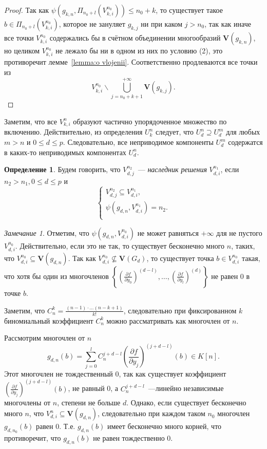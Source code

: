 \documentclass[16pt]{article}
\renewcommand{\le}{\leqslant} %
\theoremstyle{plain1}
\theoremstyle{plain2}
\theoremstyle{plain}
\theoremstyle{plain3}
\theoremstyle{definition}
\newtheorem{definition}[theorem2]{Определение}
\theoremstyle{remark}
\newtheorem{remark}[theorem1]{Замечание}
\begin{document}
\begin{proof}
 Так как $\psi(g_{k,n},\Pi_{n_0+l}({V}_{k,i}^{n_0}))\le n_0+k$, то существует такое $b\in \Pi_{n_0+l}({V}_{k,i}^{n_0})$,  которое не зануляет $g_{k,j}$ ни при каком $j>n_0$, так как иначе все точки ${V}_{k,i}^{n_0}$ содержались бы в счётном объединении многообразий $\mathbf{V}(g_{k,n})$, но целиком ${V}_{k,i}^{n_0}$ не лежало бы ни в одном из них по условию (2), это противоречит лемме~\ref{lemma:o vlojenii}. Соответственно продлеваются все точки из $${V}_{k,i}^{n_0}\backslash \bigcup\limits_{j=n_0+k+1}^{+\infty}\mathbf{V}(g_{k,j}).$$
 \end{proof}


Заметим, что все ${V}_{k,i}^n$ образуют частично упорядоченное множество по включению. Действительно, из определения ${U}_{k}^n$ следует, что ${U}_{d}^n\supseteq {U}_{d}^m$ для любых $m >n$ и $0\le d\le p$. Следовательно,
все неприводимое компоненты ${U}_{d}^m$ содержатся в каких-то неприводимых компонентах ${U}_{d}^n$.



\begin{definition}
Будем говорить, что ${V}_{d,j}^{n_2}$~--- \emph{наследник решения} ${V}_{d,i}^{n_1}$, если $n_2>n_1, 0\le d\le p$ и
$$
\left\{
 \begin{aligned}
 {V}_{d,j}^{n_2}\subseteq {V}_{d,i}^{n_1},\\
 \psi(g_{d,n},{V}_{d,i}^{n_1})=n_2.\\
 \end{aligned}
 \right.
$$
\end{definition}

\begin{remark}\label{remark:o_konechnosti_psi}
Отметим, что $\psi(g_{d,n},{V}_{d,i}^{n_0})$ не может равняться $+\infty$  для не пустого ${V}_{d,i}^{n_0}$. Действительно, если это не так, то существует бесконечно много $n$, таких, что ${V}_{d,i}^{n_0}\subseteq \mathbf{V}(g_{d,n})$. Так как ${V}_{d,i}^{n_0} \not\subseteq \mathbf{V}(G_d)$, то существует точка $b\in {V}_{d,i}^{n_0}$ такая, что хотя бы один из многочленов $\left\{\left(\frac{\partial f}{\partial y_0}\right)^{(d-l)},\ldots, \left(\frac{\partial f}{\partial y_l}\right)^{(d)} \right\}$ не равен 0 в точке $b$.

Заметим, что $C_n^k=\frac{(n-1)\cdot\ldots(n-k+1)}{k!}$, следовательно при фиксированном $k$ биномиальный коэффициент $C_n^k$ можно рассматривать как многочлен от $n$.

Рассмотрим многочлен от $n$
$$
g_{d,n}(b)=\sum\limits_{j=0}^{l}C_n^{j+d - l }\left(\frac{\partial f}{\partial y_j}\right)^{(j+d - l)}(b)\in K[n].
$$
Этот многочлен не тождественный 0, так как существует коэффициент $\left(\frac{\partial f}{\partial y_j}\right)^{(j+d - l)}(b)$, не равный 0, а $C_n^{j+d - l }$~---линейно независимые многочлены от $n$, степени не больше $d$. Однако, если существует бесконечно много $n$, что ${V}_{d,i}^n\subseteq \mathbf{V}(g_{d,n})$, следовательно при каждом таком $n_0$ многочлен $g_{d,n_0}(b)$ равен 0. Т.е. $g_{d,n}(b)$ имеет бесконечно много корней, что противоречит, что $g_{d,n}(b)$ не равен тождественно 0.
\end{remark}
\end{document}
